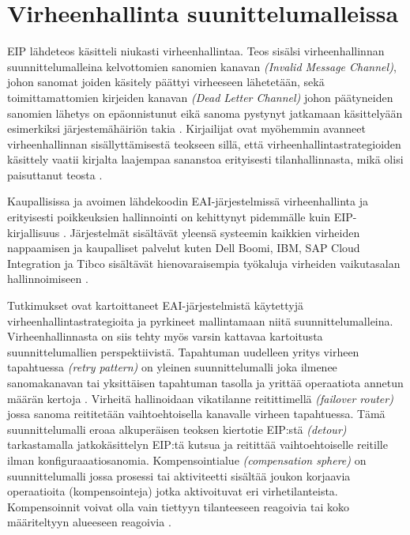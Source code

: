 \section{Virheenhallinta suunittelumalleissa}
EIP lähdeteos käsitteli niukasti virheenhallintaa. Teos sisälsi virheenhallinnan suunnittelumalleina kelvottomien sanomien kanavan \textit{(Invalid Message Channel)}, johon sanomat joiden käsitely päättyi virheeseen lähetetään, sekä toimittamattomien kirjeiden kanavan \textit{(Dead Letter Channel)} johon päätyneiden sanomien lähetys on epäonnistunut eikä sanoma pystynyt jatkamaan käsittelyään esimerkiksi järjestemähäiriön takia \citep{Hohpe2004}.
Kirjailijat ovat myöhemmin avanneet virheenhallinnan sisällyttämisestä teokseen \citep{Hohpe2004} sillä, että virheenhallintastrategioiden käsittely vaatii kirjalta laajempaa sananstoa erityisesti tilanhallinnasta, mikä olisi paisuttanut teosta \citep{Zimmermann2016}.

Kaupallisissa ja avoimen lähdekoodin EAI-järjestelmissä virheenhallinta ja erityisesti poikkeuksien hallinnointi on kehittynyt pidemmälle kuin EIP-kirjallisuus \citep{Ritter2017}. Järjestelmät sisältävät yleensä systeemin kaikkien virheiden nappaamisen ja kaupalliset palvelut kuten Dell Boomi, IBM, SAP Cloud Integration ja Tibco sisältävät hienovaraisempia työkaluja virheiden vaikutasalan hallinnoimiseen \citep{Ritter2017}.

Tutkimukset \citep{ExceptionRitter2014} \citep{ExceptionRitter2016} ovat kartoittaneet EAI-järjestelmistä käytettyjä virheenhallintastrategioita ja pyrkineet mallintamaan niitä suunnittelumalleina. Virheenhallinnasta on siis tehty myös varsin kattavaa kartoitusta suunnittelumallien perspektiivistä.
Tapahtuman uudelleen yritys virheen tapahtuessa \textit{(retry pattern)} on yleinen suunnittelumalli joka ilmenee sanomakanavan tai yksittäisen tapahtuman tasolla ja yrittää operaatiota annetun määrän kertoja \citep{ExceptionRitter2014}.
Virheitä hallinoidaan vikatilanne reitittimellä \textit{(failover router)} jossa sanoma reititetään vaihtoehtoisella kanavalle virheen tapahtuessa. Tämä suunnittelumalli eroaa alkuperäisen teoksen \citep{Hohpe2004} kiertotie EIP:stä \textit{(detour)} tarkastamalla jatkokäsittelyn EIP:tä kutsua ja reitittää vaihtoehtoiselle reitille ilman konfiguraaatiosanomia.
Kompensointialue \textit{(compensation sphere)} on suunnittelumalli jossa prosessi tai aktiviteetti sisältää joukon korjaavia operaatioita (kompensointeja) jotka aktivoituvat eri virhetilanteista. Kompensoinnit voivat olla vain tiettyyn tilanteeseen reagoivia tai koko määriteltyyn alueeseen reagoivia \citep{ExceptionRitter2014}.

